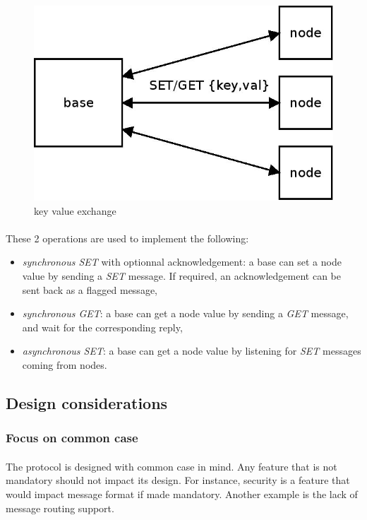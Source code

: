 \documentclass[a4paper, 11pt]{article}
\begin{document}
\begin{figure}[!h]
\begin{center}
\includegraphics[scale=0.2]{../dia/overview_keyval/main.jpeg}
\end{center}
\caption{\tiny{key value exchange}}
\label{overview_keyval}
\end{figure}

\paragraph{}
These 2 operations are used to implement the following:
\begin{itemize}
\item \textit{synchronous SET} with optionnal acknowledgement: a base can set a
node value by sending a \textit{SET} message. If required, an acknowledgement can
be sent back as a flagged message,
\item \textit{synchronous GET}: a base can get a node value by sending a
\textit{GET} message, and wait for the corresponding reply,
\item \textit{asynchronous SET}: a base can get a node value by listening for
\textit{SET} messages coming from nodes.
\end{itemize}


\subsection{Design considerations}

\subsubsection{Focus on common case}
\paragraph{}
The protocol is designed with common case in mind. Any feature that is not
mandatory should not impact its design. For instance, security is a feature
that would impact message format if made mandatory. Another example is the
lack of message routing support.
\end{document}
